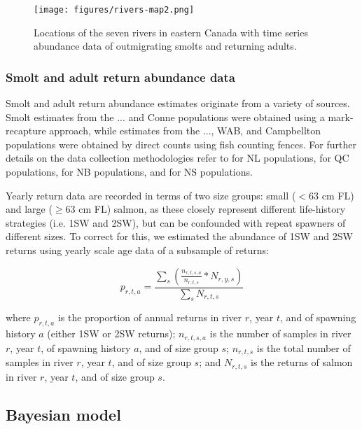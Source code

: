 \documentclass[12pt]{article}
\begin{document}
\begin{figure}[htbp] \centering
    \texttt{[image: figures/rivers-map2.png]}
    \caption{Locations of the seven rivers in eastern Canada with time series abundance data of outmigrating smolts and 
    returning adults.} \label{fig:map} 
\end{figure}

\subsubsection*{Smolt and adult return abundance data}

Smolt and adult return abundance estimates originate from a variety of
sources. Smolt estimates from the ... and Conne populations were obtained using a
mark-recapture approach, while estimates from the ..., WAB, and Campbellton populations
were obtained by direct counts using fish counting fences.
For further details on the data collection methodologies refer to 
\citet{Dempson1991, Venoitt2018} for NL populations, 
\citet{April2018}  for QC populations,
\citet{Jones2014} for NB populations,
and \citet{Gibson2009} for NS populations. 

Yearly return data are recorded in terms of two size groups: small ($< 63$ cm
FL) and large ($\geq 63$ cm FL) salmon, as these closely represent different
life-history strategies (i.e. 1SW and 2SW), but can be confounded with repeat
spawners of different sizes. To correct for this, we estimated the abundance
of 1SW and 2SW returns using yearly scale age data of a subsample of returns:

\begin{equation}
    p_{r,t,a} = \frac{\sum_{s}{(\frac{n_{r,t,s,a}}{n_{r,t,s}} * N_{r,y,s})}}{\sum_{s}{N_{r,t,s}}}
\end{equation}

where $p_{r,t,a}$ is the proportion of annual returns in river $r$, year $t$,
and of spawning history $a$ (either 1SW or 2SW returns); $n_{r,t,s,a}$ is the
number of samples in river $r$, year $t$, of spawning history $a$, and of size
group $s$; $n_{r,t,s}$ is the total number of samples in river $r$, year $t$,
and of size group $s$; and $N_{r,t,s}$ is the returns of salmon
in river $r$, year $t$, and of size group $s$.

\subsection*{Bayesian model}
\end{document}
